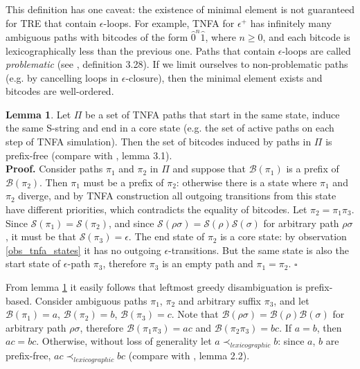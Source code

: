 \documentclass{article}
\newcommand{\Xeq}{\!=\!}
\newcommand{\XB}{\mathcal{B}}
\newcommand{\XS}{\mathcal{S}}
\theoremstyle{definition}
\newtheorem{XLem}{Lemma}
\begin{document}
\begin{multicols}{2}
This definition has one caveat: the existence of minimal element is not guaranteed for TRE that contain $\epsilon$-loops.
For example, TNFA for $\epsilon^+$ has infinitely many ambiguous paths with bitcodes
of the form $\widehat{0}^n \widehat{1}$, where $n \!\geq\! 0$,
and each bitcode is lexicographically less than the previous one.
Paths that contain $\epsilon$-loops are called \emph{problematic} (see \cite{Gra15}, definition 3.28).
If we limit ourselves to non-problematic paths (e.g. by cancelling loops in $\epsilon$-closure),
then the minimal element exists and bitcodes are well-ordered.

\begin{XLem}\label{lemma_bitcodes}
Let $\Pi$ be a set of TNFA paths that start in the same state, induce the same S-string and end in a core state
(e.g. the set of active paths on each step of TNFA simulation).
Then the set of bitcodes induced by paths in $\Pi$ is prefix-free
(compare with \cite{Gra15}, lemma 3.1).
\\[0.5em]
\textbf{Proof.}
Consider paths $\pi_1$ and $\pi_2$ in $\Pi$
and suppose that $\XB(\pi_1)$ is a prefix of $\XB(\pi_2)$.
Then $\pi_1$ must be a prefix of $\pi_2$: otherwise there is a state where $\pi_1$ and $\pi_2$ diverge,
and by TNFA construction all outgoing transitions from this state have different priorities,
which contradicts the equality of bitcodes.
Let $\pi_2 \Xeq \pi_1 \pi_3$.
Since $\XS(\pi_1) \Xeq \XS(\pi_2)$, and since $\XS(\rho\sigma) \Xeq \XS(\rho)\XS(\sigma)$ for arbitrary path $\rho\sigma$,
it must be that $\XS(\pi_3) \Xeq \epsilon$.
The end state of $\pi_2$ is a core state: by observation \ref{obs_tnfa_states} it has no outgoing $\epsilon$-transitions.
But the same state is also the start state of $\epsilon$-path $\pi_3$, therefore $\pi_3$ is an empty path and $\pi_1 \Xeq \pi_2$.
$\square$
\end{XLem}

From lemma \ref{lemma_bitcodes} it easily follows that leftmost greedy disambiguation is prefix-based.
Consider ambiguous paths $\pi_1$, $\pi_2$ and arbitrary suffix $\pi_3$,
and let $\XB(\pi_1) \Xeq a$, $\XB(\pi_2) \Xeq b$, $\XB(\pi_3) \Xeq c$.
Note that $\XB(\rho\sigma) \Xeq \XB(\rho)\XB(\sigma)$ for arbitrary path $\rho\sigma$,
therefore $\XB(\pi_1\pi_3) \Xeq ac$ and $\XB(\pi_2\pi_3) \Xeq bc$.
If $a \Xeq b$, then $ac \Xeq bc$.
Otherwise, without loss of generality let $a \prec_{lexicographic} b$: since $a$, $b$ are prefix-free, $ac \prec_{lexicographic} bc$
(compare with \cite{Gra15}, lemma 2.2).
\\


\end{multicols}
\end{document}
